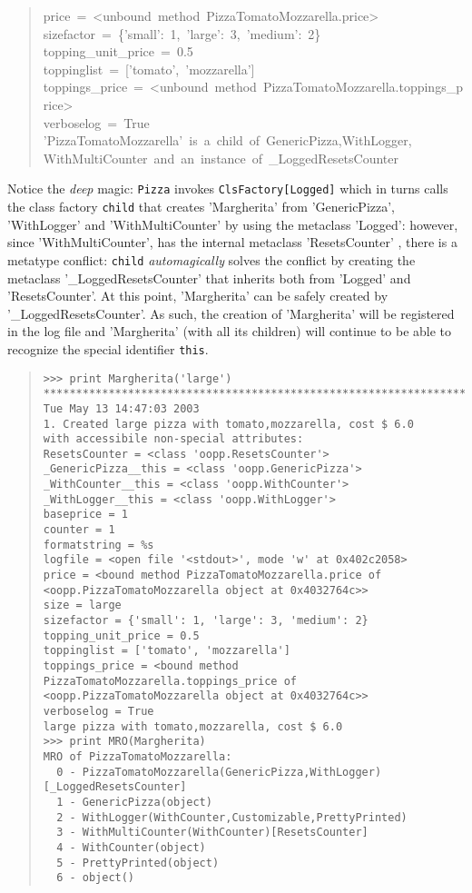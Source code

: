\documentclass[10pt,english]{article}
\begin{document}
\begin{quote}
\begin{ttfamily}
\begin{flushleft}
\mbox{price~=~<unbound~method~PizzaTomatoMozzarella.price>}\\
\mbox{sizefactor~=~{\{}'small':~1,~'large':~3,~'medium':~2{\}}}\\
\mbox{topping{\_}unit{\_}price~=~0.5}\\
\mbox{toppinglist~=~['tomato',~'mozzarella']}\\
\mbox{toppings{\_}price~=~<unbound~method~PizzaTomatoMozzarella.toppings{\_}price>}\\
\mbox{verboselog~=~True}\\
\mbox{'PizzaTomatoMozzarella'~is~a~child~of~GenericPizza,WithLogger,}\\
\mbox{WithMultiCounter~and~an~instance~of~{\_}LoggedResetsCounter}
\end{flushleft}\end{ttfamily}
\end{quote}

Notice the \emph{deep} magic: \texttt{Pizza} invokes \texttt{ClsFactory[Logged]} which in 
turns calls the class factory \texttt{child} that creates 'Margherita' from 
'GenericPizza', 'WithLogger' and 'WithMultiCounter' by using the
metaclass 'Logged': however, since 'WithMultiCounter', has the internal
metaclass 'ResetsCounter' , there is a metatype conflict:
\texttt{child} \emph{automagically} solves the conflict by creating the metaclass
'{\_}LoggedResetsCounter' that inherits both from 'Logged' and 'ResetsCounter'. 
At this point, 'Margherita' can be safely created
by '{\_}LoggedResetsCounter'. As such, the creation of 'Margherita'
will be registered in the log file and 'Margherita' (with all its
children) will continue to be able to recognize the special identifier 
\texttt{this}.
\begin{quote}
\begin{verbatim}>>> print Margherita('large')
*****************************************************************************
Tue May 13 14:47:03 2003
1. Created large pizza with tomato,mozzarella, cost $ 6.0
with accessibile non-special attributes:
ResetsCounter = <class 'oopp.ResetsCounter'>
_GenericPizza__this = <class 'oopp.GenericPizza'>
_WithCounter__this = <class 'oopp.WithCounter'>
_WithLogger__this = <class 'oopp.WithLogger'>
baseprice = 1
counter = 1
formatstring = %s
logfile = <open file '<stdout>', mode 'w' at 0x402c2058>
price = <bound method PizzaTomatoMozzarella.price of 
<oopp.PizzaTomatoMozzarella object at 0x4032764c>>
size = large
sizefactor = {'small': 1, 'large': 3, 'medium': 2}
topping_unit_price = 0.5
toppinglist = ['tomato', 'mozzarella']
toppings_price = <bound method PizzaTomatoMozzarella.toppings_price of 
<oopp.PizzaTomatoMozzarella object at 0x4032764c>>
verboselog = True
large pizza with tomato,mozzarella, cost $ 6.0
>>> print MRO(Margherita)
MRO of PizzaTomatoMozzarella:
  0 - PizzaTomatoMozzarella(GenericPizza,WithLogger)[_LoggedResetsCounter]
  1 - GenericPizza(object)
  2 - WithLogger(WithCounter,Customizable,PrettyPrinted)
  3 - WithMultiCounter(WithCounter)[ResetsCounter]
  4 - WithCounter(object)
  5 - PrettyPrinted(object)
  6 - object()\end{verbatim}
\end{quote}
\end{document}
